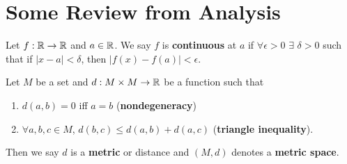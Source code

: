 \section{Some Review from Analysis} 
\begin{definition}
	Let $f : \mathbb R \rightarrow \mathbb R$ and $a \in \mathbb R$. We say $f$ is \textbf{continuous} at $a$ if $\forall \epsilon > 0$ $\exists$ $\delta > 0$ such that if $|x-a|<\delta$, then $|f(x)-f(a)|<\epsilon$. 
\end{definition}
\begin{definition}
	Let $M$ be a set and $d: M \times M \rightarrow \mathbb R$ be a function such that 
	\begin{enumerate}
		\item $d(a,b)=0$ iff $a=b$ (\textbf{nondegeneracy}) 
		\item $\forall a,b,c \in M$, $d(b,c) \leq d(a,b) + d(a,c)$ (\textbf{triangle inequality}). 
	\end{enumerate}
	Then we say $d$ is a \textbf{metric} or distance and $(M,d)$ denotes a \textbf{metric space}. 
\end{definition}

